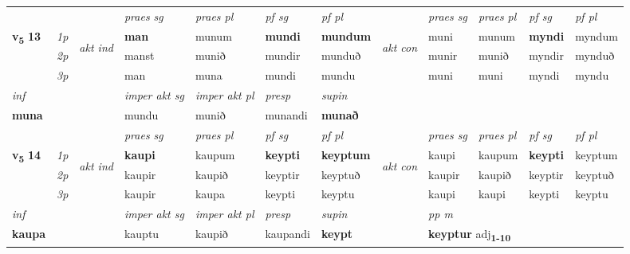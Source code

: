\begin{longtable}[l]{X>{\footnotesize\itshape}llXXXXlXXXX}
\midrule

 & &   & \textit{praes sg}  & \textit{praes pl}    & \textit{ pf sg} & \textit{pf pl} & & \textit{praes sg}  & \textit{praes pl}    & \textit{pf sg} & \textit{pf pl }  \\ \cmidrule{4-7} \cmidrule{9-12}
 \multirow{2}{*}{{{\textbf{v{\textsubscript{5}}} \Large{\textbf{13}}}}}  & 1p & \multirow{3}{*}{\begin{turn}{90}\textit{akt ind}\end{turn}} & \textbf{man} & munum & \textbf{mundi} & \textbf{mundum} & \multirow{3}{*}{\begin{turn}{90}\textit{akt con}\end{turn}} &muni & munum & \textbf{myndi} & myndum\\*
 & 2p &  &  manst  & munið & mundir & munduð & & munir & munið & myndir & mynduð \\*
 & 3p &  & man & muna & mundi & mundu & & muni & muni& myndi & myndu \\*
\cmidrule{4-7} \cmidrule{9-12}

   {\textit{inf}} & &  & \textit{imper akt sg} & \textit{imper akt pl}   & \textit{presp} & \textit{supin}   \\*
  {\textbf{muna}} & && mundu  & munið   & munandi &  \textbf{munað}   \\*

\midrule

 & &   & \textit{praes sg}  & \textit{praes pl}    & \textit{ pf sg} & \textit{pf pl} & & \textit{praes sg}  & \textit{praes pl}    & \textit{pf sg} & \textit{pf pl }  \\ \cmidrule{4-7} \cmidrule{9-12}
 \multirow{2}{*}{{{\textbf{v{\textsubscript{5}}} \Large{\textbf{14}}}}}  & 1p & \multirow{3}{*}{\begin{turn}{90}\textit{akt ind}\end{turn}} & \textbf{kaupi} & kaupum & \textbf{keypti} & \textbf{keyptum} & \multirow{3}{*}{\begin{turn}{90}\textit{akt con}\end{turn}} &kaupi & kaupum & \textbf{keypti} & keyptum\\*
 & 2p &  &  kaupir  & kaupið & keyptir & keyptuð & & kaupir & kaupið & keyptir & keyptuð \\*
 & 3p &  & kaupir & kaupa & keypti & keyptu & & kaupi & kaupi& keypti & keyptu \\*
\cmidrule{4-7} \cmidrule{9-12}

   {\textit{inf}} & &  & \textit{imper akt sg} & \textit{imper akt pl}   & \textit{presp} & \textit{supin}  && \textit{pp m} \\*
  {\textbf{kaupa}} & && kauptu  & kaupið   & kaupandi &  \textbf{keypt}  && \multicolumn{2}{l}{\textbf{keyptur} adj\textbf{\textsubscript{1-10}}} \\*


\end{longtable}
